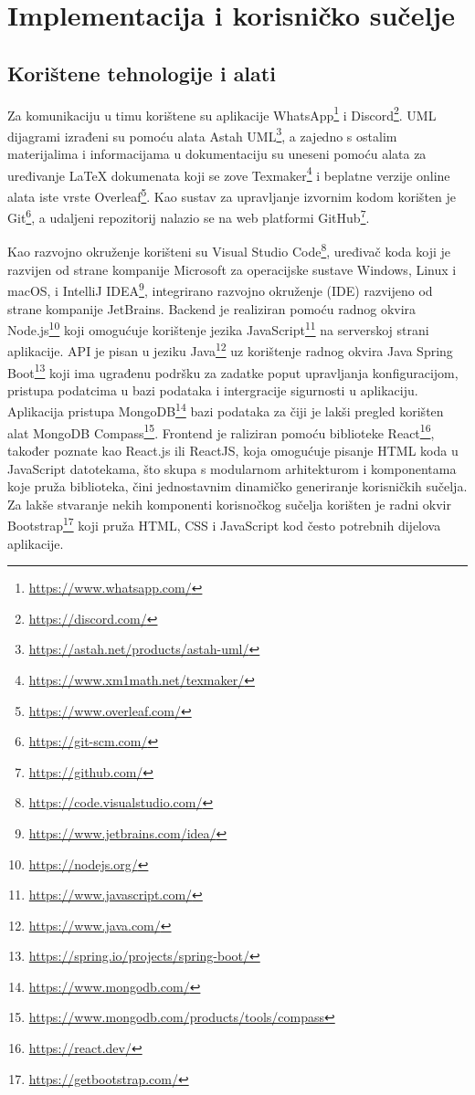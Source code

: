 \chapter{Implementacija i korisničko sučelje}
		
		
		\section{Korištene tehnologije i alati}
		
			Za komunikaciju u timu korištene su aplikacije WhatsApp\footnote{\url{https://www.whatsapp.com/}} i Discord\footnote{\url{https://discord.com/}}. UML dijagrami izrađeni su pomoću alata Astah UML\footnote{\url{https://astah.net/products/astah-uml/}}, a zajedno s ostalim materijalima i informacijama u dokumentaciju su uneseni pomoću alata za uređivanje LaTeX dokumenata koji se zove Texmaker\footnote{\url{https://www.xm1math.net/texmaker/}} i beplatne verzije online alata iste vrste Overleaf\footnote{\url{https://www.overleaf.com/}}. Kao sustav za upravljanje izvornim kodom korišten je Git\footnote{\url{https://git-scm.com/}}, a udaljeni repozitorij nalazio se na web platformi GitHub\footnote{\url{https://github.com/}}. 

Kao razvojno okruženje korišteni su Visual Studio Code\footnote{\url{https://code.visualstudio.com/}}, uređivač koda koji je razvijen od strane kompanije Microsoft za operacijske sustave Windows, Linux i macOS, i IntelliJ IDEA\footnote{\url{https://www.jetbrains.com/idea/}}, integrirano razvojno okruženje (IDE) razvijeno od strane kompanije JetBrains. Backend je realiziran pomoću radnog okvira Node.js\footnote{\url{https://nodejs.org/}} koji omogućuje korištenje jezika JavaScript\footnote{\url{https://www.javascript.com/}} na serverskoj strani aplikacije. API je pisan u jeziku Java\footnote{\url{https://www.java.com/}} uz korištenje radnog okvira Java Spring Boot\footnote{\url{https://spring.io/projects/spring-boot/}} koji ima ugrađenu podršku za zadatke poput upravljanja konfiguracijom, pristupa podatcima u bazi podataka i intergracije sigurnosti u aplikaciju. Aplikacija pristupa MongoDB\footnote{\url{https://www.mongodb.com/}} bazi podataka za čiji je lakši pregled korišten alat MongoDB Compass\footnote{\url{https://www.mongodb.com/products/tools/compass}}. Frontend je raliziran pomoću biblioteke React\footnote{\url{https://react.dev/}}, također poznate kao React.js ili ReactJS, koja omogućuje pisanje HTML koda u JavaScript datotekama, što skupa s modularnom arhitekturom i komponentama koje pruža biblioteka, čini jednostavnim dinamičko generiranje korisničkih sučelja. Za lakše stvaranje nekih komponenti korisnočkog sučelja korišten je radni okvir Bootstrap\footnote{\url{https://getbootstrap.com/}} koji pruža HTML, CSS i JavaScript kod često potrebnih dijelova aplikacije.

